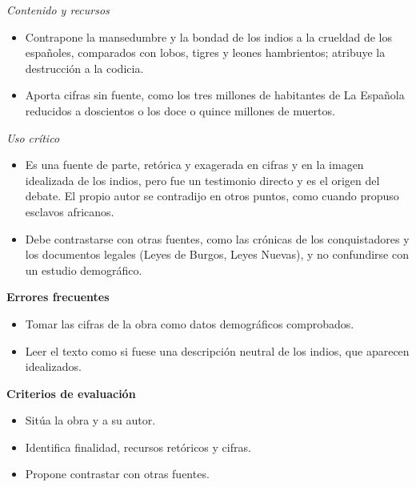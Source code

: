 \documentclass{book}
\begin{document}
\begin{tcolorbox}[title={Ejercicio resuelto}, studiumworked, breakable]
\noindent\textit{Contenido y recursos}
\begin{itemize}
\item Contrapone la mansedumbre y la bondad de los indios a la crueldad de los españoles, comparados con lobos, tigres y leones hambrientos; atribuye la destrucción a la codicia.
\item Aporta cifras sin fuente, como los tres millones de habitantes de La Española reducidos a doscientos o los doce o quince millones de muertos.
\end{itemize}

\noindent\textit{Uso crítico}
\begin{itemize}
\item Es una fuente de parte, retórica y exagerada en cifras y en la imagen idealizada de los indios, pero fue un testimonio directo y es el origen del debate. El propio autor se contradijo en otros puntos, como cuando propuso esclavos africanos.
\item Debe contrastarse con otras fuentes, como las crónicas de los conquistadores y los documentos legales (Leyes de Burgos, Leyes Nuevas), y no confundirse con un estudio demográfico.
\end{itemize}

\noindent\textbf{Errores frecuentes}
\begin{itemize}
\item Tomar las cifras de la obra como datos demográficos comprobados.
\item Leer el texto como si fuese una descripción neutral de los indios, que aparecen idealizados.
\end{itemize}

\noindent\textbf{Criterios de evaluación}
\begin{itemize}
\item Sitúa la obra y a su autor.
\item Identifica finalidad, recursos retóricos y cifras.
\item Propone contrastar con otras fuentes.
\end{itemize}
\end{tcolorbox}
\end{document}
